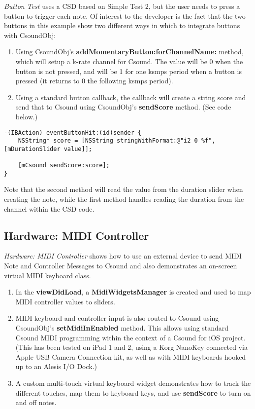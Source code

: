 \documentclass[11pt]{article}
\begin{document}
\emph{Button Test} uses a CSD based on Simple Test 2, but the user needs to press a button to trigger each note.  Of interest to the developer is the fact that the two buttons in this example show two different ways in which to integrate buttons with CsoundObj:

\begin{enumerate}
\item Using CsoundObj's \textbf{addMomentaryButton:forChannelName:} method, which will setup a k-rate channel for Csound.  The value will be 0 when the button is not pressed, and will be 1 for one ksmps period when a button is pressed (it returns to 0 the following ksmps period).
\item Using a standard button callback, the callback will create a string score and send that to Csound using CsoundObj's \textbf{sendScore} method. (See code below.)
\end{enumerate}


\begin{lstlisting}[caption=Example code showing sending score text to CsoundObj]
-(IBAction) eventButtonHit:(id)sender {
    NSString* score = [NSString stringWithFormat:@"i2 0 %f", [mDurationSlider value]];

    [mCsound sendScore:score];
}
\end{lstlisting}

Note that the second method will read the value from the duration slider when creating the note, while the first method handles reading the duration from the channel within the CSD code.

\subsection{Hardware: MIDI Controller}

\emph{Hardware: MIDI Controller} shows how to use an external device to send MIDI Note and Controller Messages to Csound and also demonstrates an on-screen virtual MIDI keyboard class.

\begin{enumerate}
\item In the \textbf{viewDidLoad}, a \textbf{MidiWidgetsManager} is created and used to map MIDI controller values to sliders.
\item MIDI keyboard and controller input is also routed to Csound using CsoundObj's \textbf{setMidiInEnabled} method. This allows using standard Csound MIDI programming within the context of a Csound for iOS project. (This has been tested on iPad 1 and 2, using a Korg NanoKey connected via Apple USB Camera Connection kit, as well as with MIDI keyboards hooked up to an Alesis I/O Dock.)
\item A custom multi-touch virtual keyboard widget demonstrates how to track the different touches, map them to keyboard keys, and use \textbf{sendScore} to turn on and off notes.
\end{enumerate}
\end{document}
